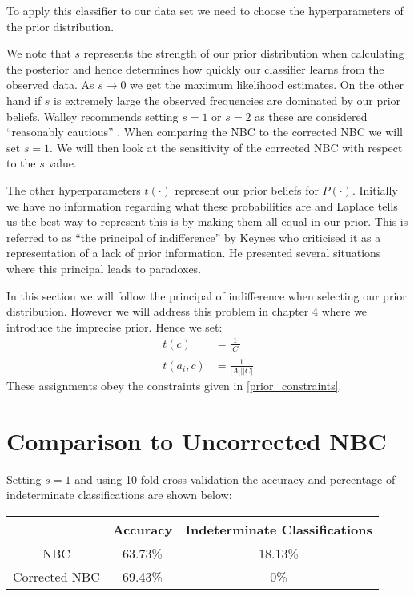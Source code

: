 To apply this classifier to our data set we need to choose the hyperparameters of the prior distribution.

We note that $s$ represents the strength of our prior distribution when calculating the posterior and hence determines how quickly our classifier learns from the observed data.
As $s \rightarrow 0$ we get the maximum likelihood estimates.
On the other hand if $s$ is extremely large the observed frequencies are dominated by our prior beliefs.
Walley recommends setting $s=1$ or $s=2$ as these are considered ``reasonably cautious'' \cite{Walley96}.
When comparing the NBC to the corrected NBC we will set $s=1$.
We will then look at the sensitivity of the corrected NBC with respect to the $s$ value.

The other hyperparameters $t(\cdot)$ represent our prior beliefs for $P(\cdot)$.
Initially we have no information regarding what these probabilities are and Laplace tells us \cite{Laplace1812} the best way to represent this is by making them all equal in our prior.
This is referred to as ``the principal of indifference'' by Keynes \cite{Keynes21} who criticised it as a representation of a lack of prior information.
He presented several situations where this principal leads to paradoxes.

In this section we will follow the principal of indifference when selecting our prior distribution.
However we will address this problem in chapter 4 where we introduce the imprecise prior.
Hence we set:
\begin{align}\label{initial prior}
	t(c)      & = \frac{1}{|C|} \\
	t(a_i, c) & = \frac{1}{|A_i||C|}
\end{align}
These assignments obey the constraints given in \cref{prior_constraints}.

\section{Comparison to Uncorrected NBC}


Setting $s=1$ and using 10-fold cross validation the accuracy and percentage of indeterminate classifications are shown below:
\begin{center}
	\begin{tabular}{ c|c c }
		              & Accuracy & Indeterminate Classifications \\
		\hline
		NBC           & 63.73\%  & 18.13\%                       \\
		Corrected NBC & 69.43\%  & 0\%
	\end{tabular}
\end{center}

